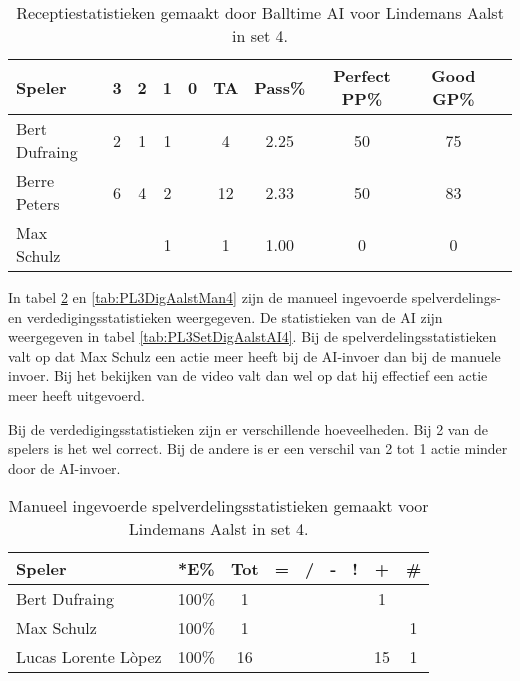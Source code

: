 \begin{table}[ht!]
  \centering
  \scriptsize
    \begin{tabular}{|l|c|c|c|c|c|c|c|c|c|} \hline
    \textbf{Speler} & 3 & 2 & 1 & 0 & TA & Pass\% & Perfect PP\% & Good GP\% \\ \hline
    Bert Dufraing & 2 & 1 & 1 &   & 4 & 2.25 & 50 & 75 \\  
    Berre Peters & 6 & 4 & 2 &  & 12 & 2.33 & 50 & 83 \\
    Max Schulz &   &  &  1 &  & 1 & 1.00 & 0 & 0 \\\hline
  \end{tabular}
  \caption[Receptiestatistieken gemaakt door Balltime AI voor Lindemans Aalst in set 4]{\label{tab:PL3ReceiveAalstAI4}Receptiestatistieken gemaakt door Balltime AI voor Lindemans Aalst in set 4.}
\end{table}

In tabel \ref{tab:PL3SetAalstMan4} en \ref{tab:PL3DigAalstMan4} zijn de manueel ingevoerde spelverdelings- en verdedigingsstatistieken weergegeven. De statistieken van de AI zijn weergegeven in tabel \ref{tab:PL3SetDigAalstAI4}.
Bij de spelverdelingsstatistieken valt op dat Max Schulz een actie meer heeft bij de AI-invoer dan bij de manuele invoer. Bij het bekijken van de video valt dan wel op dat hij effectief een actie meer heeft uitgevoerd. 

Bij de verdedigingsstatistieken zijn er verschillende hoeveelheden. Bij 2 van de spelers is het wel correct. Bij de andere is er een verschil van 2 tot 1 actie minder door de AI-invoer.

\begin{table}[ht!]
    \centering
    \scriptsize
    \begin{tabular}{|l|c|c|c|c|c|c|c|c|}
        \hline
        \textbf{Speler} & *E\% & Tot & = & / & - & ! & + & \# \\ \hline
        Bert Dufraing & 100\% & 1 &  &  &  & & 1 &  \\ 
        Max Schulz & 100\% & 1 &  &  &  & & & 1 \\ 
        Lucas Lorente Lòpez & 100\% & 16 &  &  &  &  & 15 & 1 \\ \hline
    \end{tabular}
    \caption[Manueel ingevoerde spelverdelingsstatistieken gemaakt voor Lindemans Aalst in set 4]{\label{tab:PL3SetAalstMan4}Manueel ingevoerde spelverdelingsstatistieken gemaakt voor Lindemans Aalst in set 4.}
\end{table}

